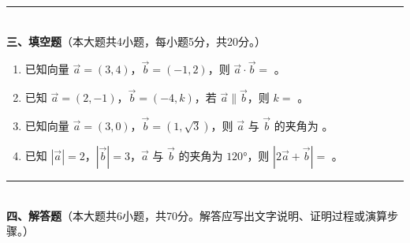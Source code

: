 \documentclass[12pt, a4paper]{ctexart}
\begin{document}
\vspace{6pt}

\noindent\rule{\textwidth}{0.4pt}\\[2pt]
{\large\bfseries 三、填空题}（本大题共4小题，每小题5分，共20分。）

\vspace{6pt}

\begin{enumerate}[resume]
\item 已知向量 $\vec{a}=(3,4)$，$\vec{b}=(-1,2)$，则 $\vec{a}\cdot\vec{b}=$ \underline{\hspace{2cm}}。

\item 已知 $\vec{a}=(2,-1)$，$\vec{b}=(-4,k)$，若 $\vec{a}\parallel\vec{b}$，则 $k=$ \underline{\hspace{2cm}}。

\item 已知向量 $\vec{a}=(3,0)$，$\vec{b}=(1,\sqrt{3})$，则 $\vec{a}$ 与 $\vec{b}$ 的夹角为 \underline{\hspace{2cm}}。

\item 已知 $|\vec{a}|=2$，$|\vec{b}|=3$，$\vec{a}$ 与 $\vec{b}$ 的夹角为 $120°$，则 $|2\vec{a}+\vec{b}|=$ \underline{\hspace{2cm}}。
\end{enumerate}

\vspace{6pt}

\noindent\rule{\textwidth}{0.4pt}\\[2pt]
{\large\bfseries 四、解答题}（本大题共6小题，共70分。解答应写出文字说明、证明过程或演算步骤。）

\vspace{6pt}
\end{document}
